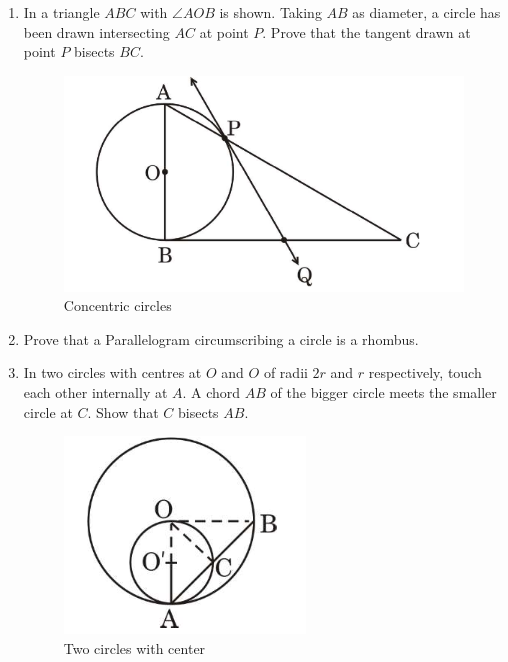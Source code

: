 \begin{enumerate}[label=\thesection.\arabic*.,ref=\theenumi]
    \item  In a triangle $ABC$ with $\angle AOB$ is shown. Taking $AB$ as diameter, a circle has been drawn intersecting $AC$ at point $P$. Prove that the tangent drawn at point $P$ bisects $BC$. 
	    \begin{figure}[H]
            \centering
                \includegraphics[width = \columnwidth]{figs/concen_circle23.png}
                \caption{Concentric circles}
                \label{fig:concen_circle23}
        \end{figure}
    \item  Prove that a Parallelogram circumscribing a circle is a rhombus.
     \item  In two circles with centres at $O$ and $O$ of radii $2r$ and $r$ respectively, touch each other internally at $A$. A chord $AB$ of the bigger circle meets the smaller circle at $C$. Show that  $C$ bisects $AB$.
    \begin{figure}[H]
        \centering
        \includegraphics[width = \columnwidth]{figs/two_circle23.png}
        \caption{Two circles with center}
        \label{fig:two_circle23}
    \end{figure}  
    

\end{enumerate}
